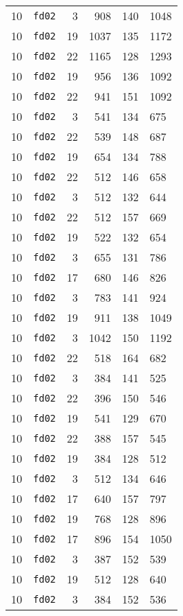 \documentclass{article}
\begin{document}
\begin{table}[h!]
\begin{tabular}{llrrrl}
    10 & \texttt{fd02} & 3 & 908 & 140 & 1048 \\
    10 & \texttt{fd02} & 19 & 1037 & 135 & 1172 \\
    10 & \texttt{fd02} & 22 & 1165 & 128 & 1293 \\
    10 & \texttt{fd02} & 19 & 956 & 136 & 1092 \\
    10 & \texttt{fd02} & 22 & 941 & 151 & 1092 \\
    10 & \texttt{fd02} & 3 & 541 & 134 & 675 \\
    10 & \texttt{fd02} & 22 & 539 & 148 & 687 \\
    10 & \texttt{fd02} & 19 & 654 & 134 & 788 \\
    10 & \texttt{fd02} & 22 & 512 & 146 & 658 \\
    10 & \texttt{fd02} & 3 & 512 & 132 & 644 \\
    10 & \texttt{fd02} & 22 & 512 & 157 & 669 \\
    10 & \texttt{fd02} & 19 & 522 & 132 & 654 \\
    10 & \texttt{fd02} & 3 & 655 & 131 & 786 \\
    10 & \texttt{fd02} & 17 & 680 & 146 & 826 \\
    10 & \texttt{fd02} & 3 & 783 & 141 & 924 \\
    10 & \texttt{fd02} & 19 & 911 & 138 & 1049 \\
    10 & \texttt{fd02} & 3 & 1042 & 150 & 1192 \\
    10 & \texttt{fd02} & 22 & 518 & 164 & 682 \\
    10 & \texttt{fd02} & 3 & 384 & 141 & 525 \\
    10 & \texttt{fd02} & 22 & 396 & 150 & 546 \\
    10 & \texttt{fd02} & 19 & 541 & 129 & 670 \\
    10 & \texttt{fd02} & 22 & 388 & 157 & 545 \\
    10 & \texttt{fd02} & 19 & 384 & 128 & 512 \\
    10 & \texttt{fd02} & 3 & 512 & 134 & 646 \\
    10 & \texttt{fd02} & 17 & 640 & 157 & 797 \\
    10 & \texttt{fd02} & 19 & 768 & 128 & 896 \\
    10 & \texttt{fd02} & 17 & 896 & 154 & 1050 \\
    10 & \texttt{fd02} & 3 & 387 & 152 & 539 \\
    10 & \texttt{fd02} & 19 & 512 & 128 & 640 \\
    10 & \texttt{fd02} & 3 & 384 & 152 & 536 \\

\end{tabular}
\end{table}
\end{document}
